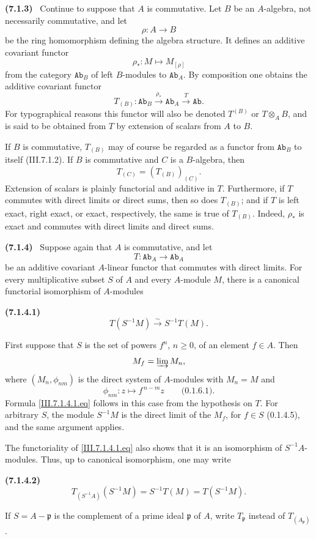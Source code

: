 \documentclass[10pt,oneside]{book}
\newcommand{\cat}[1]{\mathtt{#1}}
\newcommand{\vphi}{\phi}
\newcommand{\sref}[2][]{(#2)}
\newcommand{\oldpage}[2][]{\setcounter{footnote}{0}\marginpar{\scriptsize\textbf{#1}~|~#2}\ignorespaces}
\newenvironment{env}[1][]{\par\medskip\noindent\textbf{(#1)}\ }{\par}
\begin{document}
\begin{env}[7.1.3]
\label{III.7.1.3}
Continue to suppose that $A$ is commutative.  Let $B$ be an
$A$-algebra, not necessarily commutative, and let
\[
  \rho:A\longrightarrow B
\]
be the ring homomorphism defining the algebra structure.  It
defines an
\oldpage[III]{176}
additive covariant functor
\[
  \rho_*:M\longmapsto M_{[\rho]}
\]
from the category $\cat{Ab}_B$ of left $B$-modules to
$\cat{Ab}_A$.  By composition one obtains the additive
covariant functor
\[
  T_{(B)}:
  \cat{Ab}_B
  \xrightarrow{\rho_*}
  \cat{Ab}_A
  \xrightarrow{T}
  \cat{Ab}.
\]
For typographical reasons this functor will also be denoted
$T^{(B)}$ or $T\otimes_AB$, and is said to be obtained from $T$
by extension of scalars from $A$ to $B$.

If $B$ is commutative, $T_{(B)}$ may of course be regarded as a
functor from $\cat{Ab}_B$ to itself \sref{III.7.1.2}.  If $B$ is
commutative and $C$ is a $B$-algebra, then
\[
  T_{(C)}=(T_{(B)})_{(C)}.
\]
Extension of scalars is plainly functorial and additive in
$T$.  Furthermore, if $T$ commutes with direct limits or direct
sums, then so does $T_{(B)}$; and if $T$ is left exact, right
exact, or exact, respectively, the same is true of $T_{(B)}$.
Indeed, $\rho_*$ is exact and commutes with direct limits and
direct sums.
\end{env}

\begin{env}[7.1.4]
\label{III.7.1.4}
Suppose again that $A$ is commutative, and let
\[
  T:\cat{Ab}_A\longrightarrow\cat{Ab}_A
\]
be an additive covariant $A$-linear functor that commutes with
direct limits.  For every multiplicative subset $S$ of $A$ and
every $A$-module $M$, there is a canonical functorial
isomorphism of $A$-modules
\begin{env}[7.1.4.1]
\label{III.7.1.4.1}
\[
  T(S^{-1}M)
  \xrightarrow{\sim}
  S^{-1}T(M).
  \tag{7.1.4.1}\label{III.7.1.4.1.eq}
\]
\end{env}

First suppose that $S$ is the set of powers $f^n$,
$n\geq0$, of an element $f\in A$.  Then
\[
  M_f=\varinjlim M_n,
\]
where $(M_n,\vphi_{nm})$ is the direct system of $A$-modules
with $M_n=M$ and
\[
  \vphi_{nm}:z\longmapsto f^{\,n-m}z
  \qquad\text{\sref[0]{0.1.6.1}}.
\]
Formula \eqref{III.7.1.4.1.eq} follows in this case from the
hypothesis on $T$.  For arbitrary $S$, the module $S^{-1}M$ is
the direct limit of the $M_f$, for $f\in S$
\sref[0]{0.1.4.5}, and the same argument applies.

The functoriality of \eqref{III.7.1.4.1.eq} also shows that it
is an isomorphism of $S^{-1}A$-modules.  Thus, up to canonical
isomorphism, one may write
\begin{env}[7.1.4.2]
\label{III.7.1.4.2}
\[
  T_{(S^{-1}A)}(S^{-1}M)
  =
  S^{-1}T(M)
  =
  T(S^{-1}M).
  \tag{7.1.4.2}\label{III.7.1.4.2.eq}
\]
\end{env}
If $S=A-\mathfrak p$ is the complement of a prime ideal
$\mathfrak p$ of $A$, write $T_{\mathfrak p}$ instead of
$T_{(A_{\mathfrak p})}$.
\end{env}
\end{document}
